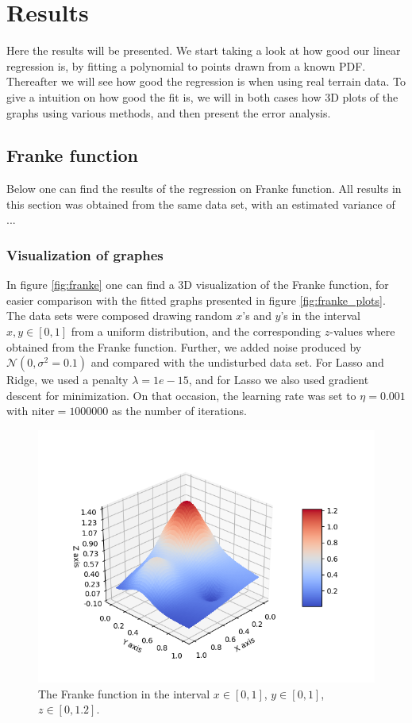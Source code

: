 \section{Results} \label{sec:results}
Here the results will be presented. We start taking a look at how good our linear regression is, by fitting a polynomial to points drawn from a known PDF. Thereafter we will see how good the regression is when using real terrain data. To give a intuition on how good the fit is, we will in both cases how 3D plots of the graphs using various methods, and then present the error analysis. 

\subsection{Franke function}
Below one can find the results of the regression on Franke function. All results in this section was obtained from the same data set, with an estimated variance of ...

\subsubsection{Visualization of graphes}
In figure \eqref{fig:franke} one can find a 3D visualization of the Franke function, for easier comparison with the fitted graphs presented in figure \eqref{fig:franke_plots}. The data sets were composed drawing random $x$'s and $y$'s in the interval $x,y\in[0,1]$ from a uniform distribution, and the corresponding $z$-values where obtained from the Franke function. Further, we added noise produced by $\mathcal{N}(0, \sigma^2=0.1)$ and compared with the undisturbed data set. For Lasso and Ridge, we used a penalty $\lambda=1e-15$, and for Lasso we also used gradient descent for minimization. On that occasion, the learning rate was set to $\eta=0.001$ with niter$=1000000$ as the number of iterations. 
 \begin{figure} [h]
 	\centering
 	\includegraphics[scale=0.8]{../plots/franke.png}
 	\caption{The Franke function in the interval $x\in[0,1]$, $y\in[0,1]$, $z\in[0, 1.2]$.}
 	\label{fig:franke}
 \end{figure}

